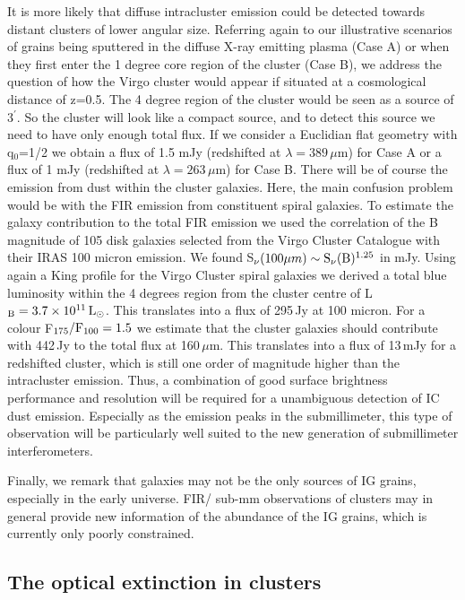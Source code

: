 \documentclass[]{aa}
\begin{document}
It is more likely that diffuse intracluster emission could be
detected towards distant clusters of lower angular size. Referring again
to our illustrative scenarios of grains being sputtered in the 
diffuse X-ray emitting plasma (Case A) or when they first enter the 1 degree 
core region of the cluster (Case B), we address the question of how  
the Virgo cluster would appear if situated at a cosmological distance of 
z=0.5. The 4 degree region 
of the cluster would be seen as a source of 3$^{\prime}$. So the cluster will 
look like a compact source, and to detect this source we need to have only 
enough total flux. If we consider a Euclidian flat geometry with q$_0$=1/2 
we obtain a flux of 1.5 mJy (redshifted at ${\lambda}=389\,{\mu}$m) for Case A
or a flux of 1 mJy (redshifted at ${\lambda}=263\,{\mu}$m) for Case B. There
will be of course the emission from dust within the cluster galaxies. Here,
the main confusion problem would be with the FIR emission from constituent
spiral galaxies. To 
estimate the galaxy contribution to the total FIR emission we used the 
correlation of the B magnitude of 105 disk galaxies selected from the Virgo
Cluster Catalogue with 
their IRAS 100 micron emission. We found S$_{\nu}(100{\mu}m) 
\sim {\rm S}_{\nu}({\rm B})^{1.25}$ in mJy. Using again a King profile for 
the Virgo Cluster 
spiral galaxies we derived a total blue luminosity within the 4 degrees 
region from the cluster centre of 
L$_{\rm B}= 3.7\times 10^{11}\,{\rm L}_{\odot}$. 
This translates into a flux of 295\,Jy at 100 micron. For a colour 
F$_{175}/{\rm F}_{100}=1.5$ we estimate that the cluster galaxies should 
contribute with 442\,Jy to the total flux at 160\,${\mu}$m. This translates 
into a flux of 13\,mJy for a redshifted cluster, which is
still one order of magnitude higher than the intracluster emission. Thus,
a combination of good surface brightness performance and resolution will be
required for a unambiguous detection of IC dust emission. Especially
as the emission peaks in the submillimeter, this type
of observation will be particularly well suited to the new generation of
submillimeter interferometers.

Finally, we remark that galaxies may not be the only sources of IG grains,
especially in the early universe. FIR/ sub-mm observations of clusters may in
general provide new information of the abundance of the IG grains, which is
currently only poorly constrained.

\subsection{The optical extinction in clusters}
\end{document}
